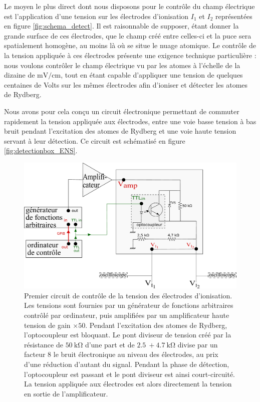 Le moyen le plus direct dont nous disposons pour le contrôle du champ électrique est l'application d'une tension sur les électrodes d'ionisation $I_1$ et $I_2$ représentées en figure \eqref{fig:schema_detect}.
Il est raisonnable de supposer, étant donner la grande surface de ces électrodes, que le champ créé entre celles-ci et la puce sera spatialement homogène, au moins là où se situe le nuage atomique.
Le contrôle de la tension appliquée à ces électrodes présente une exigence technique particulière :
nous voulons contrôler le champ électrique vu par les atomes à l'échelle de la dizaine de $\si{\mV/\cm}$, tout en étant capable d'appliquer une tension de quelques centaines de Volts sur les mêmes électrodes afin d'ioniser et détecter les atomes de Rydberg.

Nous avons pour cela conçu un circuit électronique permettant de commuter rapidement la tension appliquée aux électrodes, entre une voie basse tension à bas bruit pendant l'excitation des atomes de Rydberg et une voie haute tension servant à leur détection.
Ce circuit est schématisé en figure \eqref{fig:detectionbox_ENS}.
%
\begin{figure}[h]
\centering
\includegraphics[width=.8\linewidth]{figures/detectionbox_ENS}
\caption[Premier circuit de contrôle de la tension des électrodes d'ionisation]{
Premier circuit de contrôle de la tension des électrodes d'ionisation.
Les tensions sont fournies par un générateur de fonctions arbitraires contrôlé par ordinateur, puis amplifiées par un amplificateur haute tension de gain $\times \num{50}$.
Pendant l'excitation des atomes de Rydberg, l'optocoupleur est bloquant.
Le pont diviseur de tension créé par la résistance de $\SI{50}{\kilo\ohm}$ d'une part et de $\SI{2.5}{} + \SI{4.7}{\kilo\ohm}$ divise par un facteur $\num{8}$ le bruit électronique au niveau des électrodes, au prix d'une réduction d'autant du signal.
Pendant la phase de détection, l'optocoupleur est passant et le pont diviseur est ainsi court-circuité.
La tension appliquée aux électrodes est alors directement la tension en sortie de l'amplificateur.
}
\label{fig:detectionbox_ENS}
\end{figure}
%

